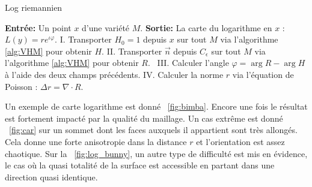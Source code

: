 \documentclass[11pt]{article}
\begin{document}
	\begin{algorithm}[h]
		\caption{Log riemannien}
		\label{alg:log}
		\begin{algorithmic}
			\State \textbf{Entrée:} Un point $x$ d'une variété $M$.
			\State \textbf{Sortie:} La carte du logarithme en $x$ : $L(y) = r e^{\iota \varphi}$.
			\State \hspace{10pt} I. \; Transporter $H_0=1$ depuis $x$ sur tout $M$ via l'algorithme \ref{alg:VHM} pour obtenir $H$.
			\State \hspace{6pt} II. \; Transporter $\vec{n}$ depuis $C_\epsilon$ sur tout $M$ via l'algorithme \ref{alg:VHM} pour obtenir $R$.
			\State \, III. \; Calculer l'angle $\varphi = \arg R - \arg H$ à l'aide des deux champs précédents.
			\State \hspace{3pt} IV. \; Calculer la norme $r$ via l'équation de Poisson : $ \Delta r = \nabla \cdot R$.
		\end{algorithmic}
	\end{algorithm}
	Un exemple de carte logarithme est donné \figurename~\ref{fig:bimba}. Encore une fois le résultat est fortement impacté par la qualité du maillage. Un cas extrême est donné \figurename~\ref{fig:car} sur un sommet dont les faces auxquels il appartient sont très allongés. Cela donne une forte anisotropie dans la distance $r$ et l'orientation est assez chaotique. Sur la \figurename~\ref{fig:log_bunny}, un autre type de difficulté est mis en évidence, le cas où la quasi totalité de la surface est accessible en partant dans une direction quasi identique.
	
\end{document}
